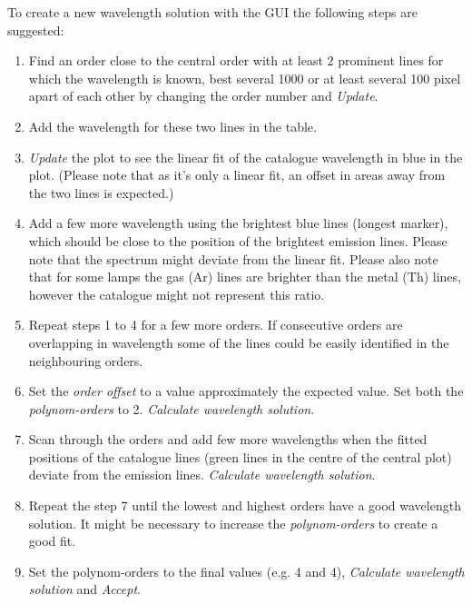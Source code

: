 \documentclass[10pt,a4paper]{article}
\begin{document}
To create a new wavelength solution with the GUI the following steps are suggested:
\begin{enumerate}\setlength\itemsep{0em}
  \item Find an order close to the central order with at least 2 prominent lines for which the wavelength is known, best several 1000 or at least several 100 pixel apart of each other by changing the order number and \textit{Update}.
  \item Add the wavelength for these two lines in the table.
  \item \textit{Update} the plot to see the linear fit of the catalogue wavelength in blue in the plot. (Please note that as it's only a linear fit, an offset in areas away from the two lines is expected.)
  \item Add a few more wavelength using the brightest blue lines (longest marker), which should be close to the position of the brightest emission lines. Please note that the spectrum might deviate from the linear fit. Please also note that for some lamps the gas (Ar) lines are brighter than the metal (Th) lines, however the catalogue might not represent this ratio.
  \item Repeat steps 1 to 4 for a few more orders. If consecutive orders are overlapping in wavelength some of the lines could be easily identified in the neighbouring orders.
  \item Set the \textit{order offset} to a value approximately the expected value. Set both the \textit{polynom-orders} to 2. \textit{Calculate wavelength solution}.
  \item Scan through the orders and add few more wavelengths when the fitted positions of the catalogue lines (green lines in the centre of the central plot) deviate from the emission lines. \textit{Calculate wavelength solution}.
  \item Repeat the step 7 until the lowest and highest orders have a good wavelength solution. It might be necessary to increase the \textit{polynom-orders} to create a good fit.
  \item Set the polynom-orders to the final values (e.g. 4 and 4), \textit{Calculate wavelength solution} and \textit{Accept}.
\end{enumerate}
\end{document}
